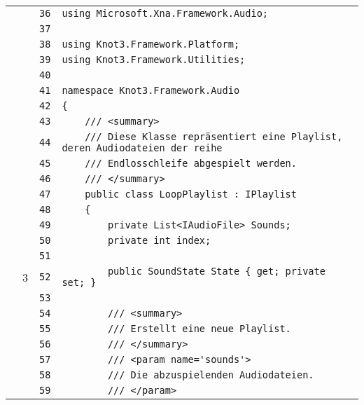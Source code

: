 \documentclass[a4paper,10pt]{article}
\begin{document}
\begin{longtable}[l]{lrrl}
\cellcolor{gray} &  & \verb~36~ & \verb~using Microsoft.Xna.Framework.Audio;~\\
\cellcolor{gray} &  & \verb~37~ & \verb~~\\
\cellcolor{gray} &  & \verb~38~ & \verb~using Knot3.Framework.Platform;~\\
\cellcolor{gray} &  & \verb~39~ & \verb~using Knot3.Framework.Utilities;~\\
\cellcolor{gray} &  & \verb~40~ & \verb~~\\
\cellcolor{gray} &  & \verb~41~ & \verb~namespace Knot3.Framework.Audio~\\
\cellcolor{gray} &  & \verb~42~ & \verb~{~\\
\cellcolor{gray} &  & \verb~43~ & \verb~    /// <summary>~\\
\cellcolor{gray} &  & \verb~44~ & \verb~    /// Diese Klasse repräsentiert eine Playlist, deren Audiodateien der reihe~\\
\cellcolor{gray} &  & \verb~45~ & \verb~    /// Endlosschleife abgespielt werden.~\\
\cellcolor{gray} &  & \verb~46~ & \verb~    /// </summary>~\\
\cellcolor{gray} &  & \verb~47~ & \verb~    public class LoopPlaylist : IPlaylist~\\
\cellcolor{gray} &  & \verb~48~ & \verb~    {~\\
\cellcolor{gray} &  & \verb~49~ & \verb~        private List<IAudioFile> Sounds;~\\
\cellcolor{gray} &  & \verb~50~ & \verb~        private int index;~\\
\cellcolor{gray} &  & \verb~51~ & \verb~~\\
\cellcolor{green} & 3 & \verb~52~ & \verb~        public SoundState State { get; private set; }~\\
\cellcolor{gray} &  & \verb~53~ & \verb~~\\
\cellcolor{gray} &  & \verb~54~ & \verb~        /// <summary>~\\
\cellcolor{gray} &  & \verb~55~ & \verb~        /// Erstellt eine neue Playlist.~\\
\cellcolor{gray} &  & \verb~56~ & \verb~        /// </summary>~\\
\cellcolor{gray} &  & \verb~57~ & \verb~        /// <param name='sounds'>~\\
\cellcolor{gray} &  & \verb~58~ & \verb~        /// Die abzuspielenden Audiodateien.~\\
\cellcolor{gray} &  & \verb~59~ & \verb~        /// </param>~\\

\end{longtable}
\end{document}
